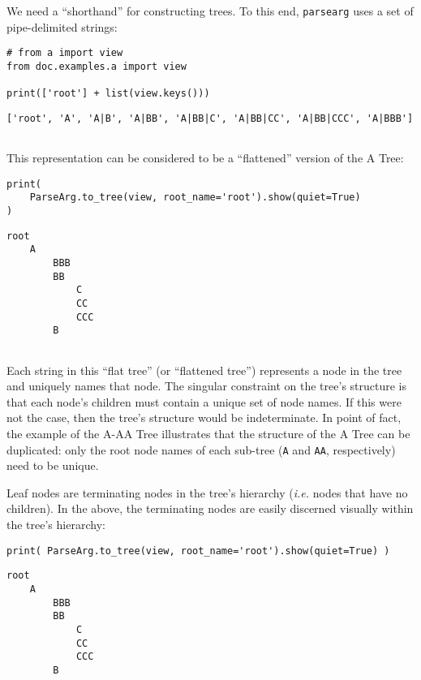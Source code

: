 \documentclass[10pt]{amsart}
\numberwithin{equation}{section}
\begin{document}
We need a ``shorthand'' for constructing trees.
To this end, \texttt{parsearg} uses a set of pipe-delimited strings: 
\begin{verbatim}
# from a import view
from doc.examples.a import view

print(['root'] + list(view.keys()))
\end{verbatim}

\begin{verbatim}
['root', 'A', 'A|B', 'A|BB', 'A|BB|C', 'A|BB|CC', 'A|BB|CCC', 'A|BBB']


\end{verbatim}


This representation can be considered to be a ``flattened'' version
of the A Tree:
\begin{verbatim}
print(
    ParseArg.to_tree(view, root_name='root').show(quiet=True) 
)
\end{verbatim}

\begin{verbatim}
root
    A
        BBB
        BB
            C
            CC
            CCC
        B


\end{verbatim}

Each string in this ``flat tree'' (or ``flattened tree'')
represents a node in the tree and uniquely names that node. 
The singular constraint on the tree's structure is that each node's
children must contain a unique set of node names.
If this were not the case, then the tree's structure would be indeterminate. 
In point of fact, the example of the A-AA Tree illustrates that the structure of 
the A Tree can be duplicated: only the root
node names of each sub-tree (\texttt{A} and \texttt{AA}, respectively) need to be unique.

Leaf nodes are terminating nodes in the tree's hierarchy (\emph{i.e.} nodes that
have no children).  In the above, the terminating nodes are easily discerned
visually within the tree's hierarchy:
\begin{verbatim}
print( ParseArg.to_tree(view, root_name='root').show(quiet=True) )
\end{verbatim}

\begin{verbatim}
root
    A
        BBB
        BB
            C
            CC
            CCC
        B


\end{verbatim}
\end{document}
